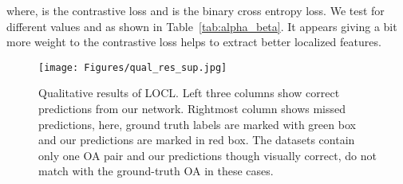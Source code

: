 \documentclass{bmvc2k}
\begin{document}
where,  is the contrastive loss and  is the binary cross entropy loss. We test for different values  and  as shown in Table~\ref{tab:alpha_beta}. It appears giving a bit more weight to the contrastive loss helps  to extract better localized features. 

\begin{figure*}[]
    \texttt{[image: Figures/qual\_res\_sup.jpg]}
    \caption{Qualitative results of LOCL. Left three columns show correct predictions from our network. Rightmost column shows missed predictions, here, ground truth labels are marked with green box and our predictions are marked in red box. The datasets contain only one OA pair and our predictions though visually correct, do not match with the ground-truth OA in these cases.}
    \label{fig:Qual-Results-sup}
\end{figure*}
\end{document}
